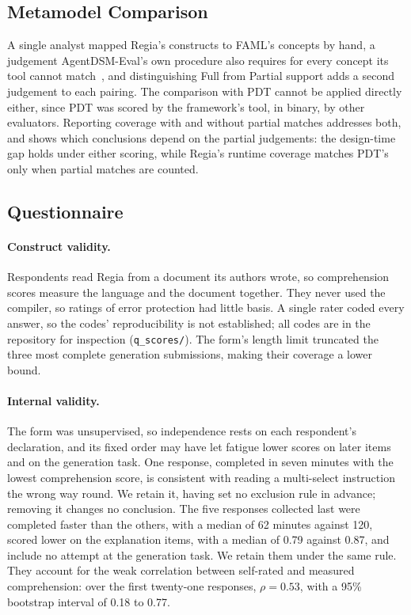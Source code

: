 \subsection{Metamodel Comparison}
\label{sec:threats-faml}
\label{sec:faml-comparison-threats}
 
A single analyst mapped Regia's constructs to FAML's concepts by hand, a judgement AgentDSM-Eval's own procedure also requires for every concept its tool cannot match~\cite{Alaca2021}, and distinguishing Full from Partial support adds a second judgement to each pairing. The comparison with PDT cannot be applied directly either, since PDT was scored by the framework's tool, in binary, by other evaluators. Reporting coverage with and without partial matches addresses both, and shows which conclusions depend on the partial judgements: the design-time gap holds under either scoring, while Regia's runtime coverage matches PDT's only when partial matches are counted.
 
\subsection{Questionnaire}
\label{sec:threats-questionnaire}
 
\paragraph{Construct validity.} Respondents read Regia from a document its authors wrote, so comprehension scores measure the language and the document together. They never used the compiler, so ratings of error protection had little basis. A single rater coded every answer, so the codes' reproducibility is not established; all codes are in the repository for inspection (\lstinline{q_scores/}). The form's length limit truncated the three most complete generation submissions, making their coverage a lower bound.
 
\paragraph{Internal validity.} The form was unsupervised, so independence rests on each respondent's declaration, and its fixed order may have let fatigue lower scores on later items and on the generation task. One response, completed in seven minutes with the lowest comprehension score, is consistent with reading a multi-select instruction the wrong way round. We retain it, having set no exclusion rule in advance; removing it changes no conclusion. The five responses collected last were completed faster than the others, with a median of 62 minutes against 120, scored lower on the explanation items, with a median of 0.79 against 0.87, and include no attempt at the generation task. We retain them under the same rule. They account for the weak correlation between self-rated and measured comprehension: over the first twenty-one responses, $\rho = 0.53$, with a 95\% bootstrap interval of 0.18 to 0.77.
 
